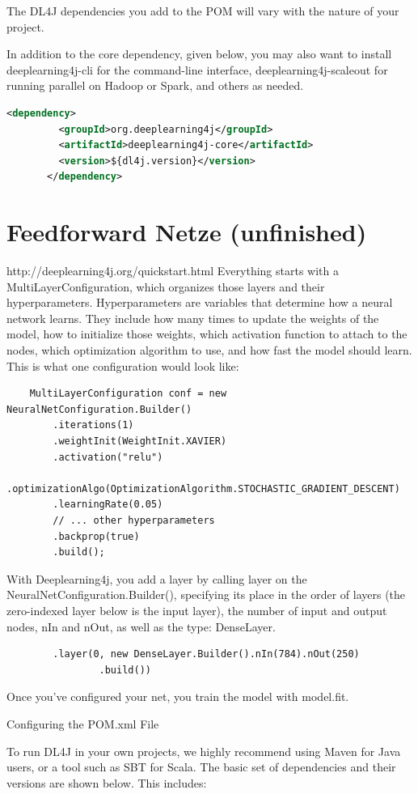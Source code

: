 {The DL4J dependencies you add to the POM will vary with the nature of your project.

In addition to the core dependency, given below, you may also want to install deeplearning4j-cli for the command-line interface, deeplearning4j-scaleout for running parallel on Hadoop or Spark, and others as needed.
\begin{lstlisting}[language=XML,caption=applicationContext.xml]
	   <dependency>
	     <groupId>org.deeplearning4j</groupId>
	     <artifactId>deeplearning4j-core</artifactId>
	     <version>${dl4j.version}</version>
	   </dependency>
\end{lstlisting}

\section{Feedforward Netze (unfinished)}
http://deeplearning4j.org/quickstart.html
Everything starts with a MultiLayerConfiguration, which organizes those layers and their hyperparameters.
Hyperparameters are variables that determine how a neural network learns. They include how many times to update the weights of the model, how to initialize those weights, which activation function to attach to the nodes, which optimization algorithm to use, and how fast the model should learn. This is what one configuration would look like:
\begin{lstlisting}
    MultiLayerConfiguration conf = new NeuralNetConfiguration.Builder()
        .iterations(1)
        .weightInit(WeightInit.XAVIER)
        .activation("relu")
        .optimizationAlgo(OptimizationAlgorithm.STOCHASTIC_GRADIENT_DESCENT)
        .learningRate(0.05)
        // ... other hyperparameters
        .backprop(true)
        .build();
\end{lstlisting}
With Deeplearning4j, you add a layer by calling layer on the NeuralNetConfiguration.Builder(), specifying its place in the order of layers (the zero-indexed layer below is the input layer), the number of input and output nodes, nIn and nOut, as well as the type: DenseLayer.
\begin{lstlisting}
        .layer(0, new DenseLayer.Builder().nIn(784).nOut(250)
                .build())
\end{lstlisting}
Once you’ve configured your net, you train the model with model.fit.

Configuring the POM.xml File

To run DL4J in your own projects, we highly recommend using Maven for Java users, or a tool such as SBT for Scala. The basic set of dependencies and their versions are shown below. This includes:

}
